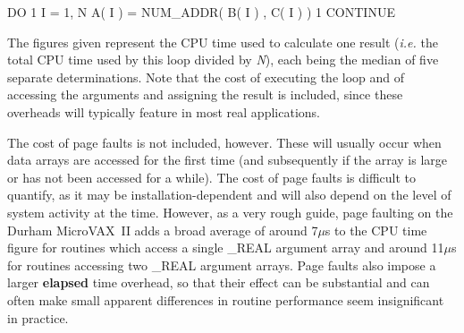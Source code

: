 \documentclass[11pt,nolof]{starlink}
\providecommand{\name}[1]{\mbox{#1}}
\providecommand{\fortvar}[1]{\mbox{\emph{#1}}}
\begin{document}
\begin{terminalv}
  DO 1 I = 1, N
    A( I ) = NUM_ADDR( B( I ) , C( I ) )
1 CONTINUE
\end{terminalv}

The figures given represent the \name{CPU} time used to calculate one result
(\emph{i.e.} the total \name{CPU} time used by this loop divided by
\fortvar{N}), each being the median of five separate determinations.
Note that the cost of executing the loop and of accessing the arguments and
assigning the result is included, since these overheads will typically
feature in most real applications.

The cost of page faults is not included, however.
These will usually occur when data arrays are accessed for the first time
(and subsequently if the array is large or has not been accessed for a while).
The cost of page faults is difficult to quantify, as it may be
installation-dependent and will also depend on the level of system activity
at the time.
However, as a very rough guide, page faulting on the Durham \name{MicroVAX}~II
adds a broad average of around 7$\mu$s to the \name{CPU} time figure for
routines which access a single \name{\_REAL} argument array and around 11$\mu$s
for routines accessing two \name{\_REAL} argument arrays.
Page faults also impose a larger \textbf{elapsed} time overhead, so that their
effect can be substantial and can often make small apparent differences in
routine performance seem insignificant in practice.

\newpage
\end{document}
